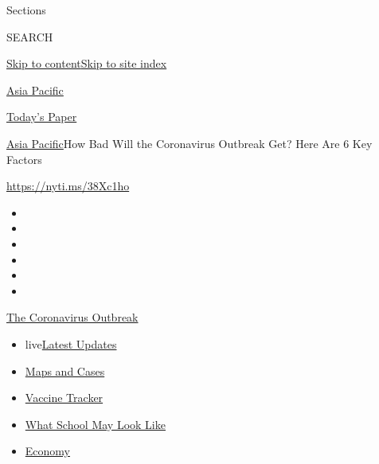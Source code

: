 Sections

SEARCH

\protect\hyperlink{site-content}{Skip to
content}\protect\hyperlink{site-index}{Skip to site index}

\href{https://www.nytimes.com/section/world/asia}{Asia Pacific}

\href{https://myaccount.nytimes.com/auth/login?response_type=cookie\&client_id=vi}{}

\href{https://www.nytimes.com/section/todayspaper}{Today's Paper}

\href{/section/world/asia}{Asia Pacific}\textbar{}How Bad Will the
Coronavirus Outbreak Get? Here Are 6 Key Factors

\url{https://nyti.ms/38Xc1ho}

\begin{itemize}
\item
\item
\item
\item
\item
\item
\end{itemize}

\href{https://www.nytimes.com/news-event/coronavirus?action=click\&pgtype=Article\&state=default\&region=TOP_BANNER\&context=storylines_menu}{The
Coronavirus Outbreak}

\begin{itemize}
\tightlist
\item
  live\href{https://www.nytimes.com/2020/08/02/world/coronavirus-updates.html?action=click\&pgtype=Article\&state=default\&region=TOP_BANNER\&context=storylines_menu}{Latest
  Updates}
\item
  \href{https://www.nytimes.com/interactive/2020/us/coronavirus-us-cases.html?action=click\&pgtype=Article\&state=default\&region=TOP_BANNER\&context=storylines_menu}{Maps
  and Cases}
\item
  \href{https://www.nytimes.com/interactive/2020/science/coronavirus-vaccine-tracker.html?action=click\&pgtype=Article\&state=default\&region=TOP_BANNER\&context=storylines_menu}{Vaccine
  Tracker}
\item
  \href{https://www.nytimes.com/interactive/2020/07/29/us/schools-reopening-coronavirus.html?action=click\&pgtype=Article\&state=default\&region=TOP_BANNER\&context=storylines_menu}{What
  School May Look Like}
\item
  \href{https://www.nytimes.com/live/2020/07/31/business/stock-market-today-coronavirus?action=click\&pgtype=Article\&state=default\&region=TOP_BANNER\&context=storylines_menu}{Economy}
\end{itemize}

